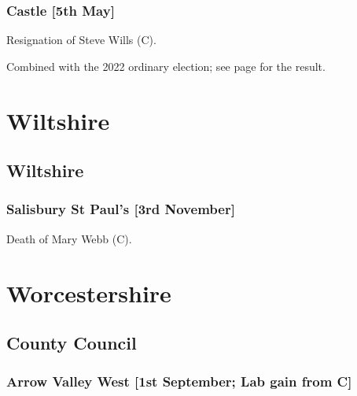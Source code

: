 \documentclass[a4paper,openany]{book}
\begin{document}
\begin{resultsiii}
\subsubsection*{Castle \hspace*{\fill}\nolinebreak[1]%
	\enspace\hspace*{\fill}
	[5th May]}


Resignation of Steve Wills (C).

Combined with the 2022 ordinary election; see page \pageref{WorthingCastle} for the result.

\section{Wiltshire}

\subsection*{Wiltshire}

\subsubsection*{Salisbury St Paul's \hspace*{\fill}\nolinebreak[1]%
	\enspace\hspace*{\fill}
	[3rd November]}


Death of Mary Webb (C).

\section{Worcestershire}

\subsection*{County Council}

\subsubsection*{Arrow Valley West \hspace*{\fill}\nolinebreak[1]%
	\enspace\hspace*{\fill}
	[1st September; Lab gain from C]}


\end{resultsiii}
\end{document}

